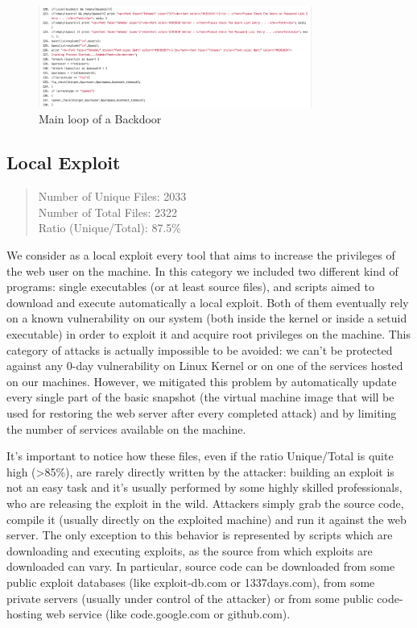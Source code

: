 \begin{figure}[H]
\centerline{\includegraphics[width=0.8\textwidth]{Images/bruteForcer.jpg}}
\caption{Main loop of a Backdoor\label{fig:bruteForcer}}
\end{figure}

\subsection{Local Exploit}

\begin{quote}
Number of Unique Files: 2033\\
Number of Total Files: 2322\\
Ratio (Unique/Total): 87.5\%
\end{quote}

We consider as a local exploit every tool that aims to increase the privileges of the web user on the machine. In this category we included two different kind of programs: single executables (or at least source files), and scripts aimed to download and execute automatically a local exploit. Both of them eventually rely on a known vulnerability on our system (both inside the kernel or inside a setuid executable) in order to exploit it and acquire root privileges on the machine.
This category of attacks is actually impossible to be avoided: we can't be protected against any 0-day vulnerability on Linux Kernel or on one of the services hosted on our machines. However, we mitigated this problem by automatically update every single part of the basic snapshot (the virtual machine image that will be used for restoring the web server after every completed attack) and by limiting the number of services available on the machine.

It's important to notice how these files, even if the ratio Unique/Total is quite high (>85\%), are rarely directly written by the attacker: building an exploit is not an easy task and it's usually performed by some highly skilled professionals, who are releasing the exploit in the wild. Attackers simply grab the source code, compile it (usually directly on the exploited machine) and run it against the web server. The only exception to this behavior is represented by scripts which are downloading and executing exploits, as the source from which exploits are downloaded can vary. In particular, source code can be downloaded from some public exploit databases (like exploit-db.com or 1337days.com), from some private servers (usually under control of the attacker) or from some public code-hosting web service (like code.google.com or github.com).

